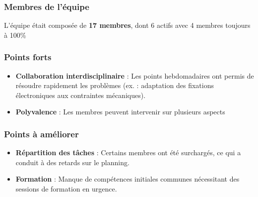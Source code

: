 \subsubsection{Membres de l'équipe}
L’équipe était composée de \textbf{17 membres}, dont 6 actifs avec 4 membres toujours à 100\%

\subsubsection*{Points forts}
\begin{itemize}
    \item \textbf{Collaboration interdisciplinaire} : Les points hebdomadaires ont permis de résoudre rapidement les problèmes (ex. : adaptation des fixations électroniques aux contraintes mécaniques).
    \item \textbf{Polyvalence} : Les membres peuvent intervenir sur plusieurs aspects
\end{itemize}

\subsubsection*{Points à améliorer}
\begin{itemize}
    \item \textbf{Répartition des tâches} : Certains membres ont été surchargés, ce qui a conduit à des retards sur le planning.
    \item \textbf{Formation} : Manque de compétences initiales communes nécessitant des sessions de formation en urgence.
\end{itemize}
